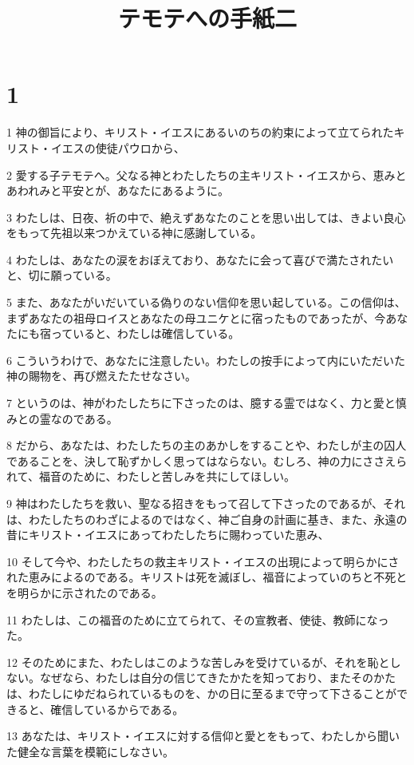 

\title{テモテへの手紙二}


\chapter{1}

\par 1 神の御旨により、キリスト・イエスにあるいのちの約束によって立てられたキリスト・イエスの使徒パウロから、
\par 2 愛する子テモテへ。父なる神とわたしたちの主キリスト・イエスから、恵みとあわれみと平安とが、あなたにあるように。
\par 3 わたしは、日夜、祈の中で、絶えずあなたのことを思い出しては、きよい良心をもって先祖以来つかえている神に感謝している。
\par 4 わたしは、あなたの涙をおぼえており、あなたに会って喜びで満たされたいと、切に願っている。
\par 5 また、あなたがいだいている偽りのない信仰を思い起している。この信仰は、まずあなたの祖母ロイスとあなたの母ユニケとに宿ったものであったが、今あなたにも宿っていると、わたしは確信している。
\par 6 こういうわけで、あなたに注意したい。わたしの按手によって内にいただいた神の賜物を、再び燃えたたせなさい。
\par 7 というのは、神がわたしたちに下さったのは、臆する霊ではなく、力と愛と慎みとの霊なのである。
\par 8 だから、あなたは、わたしたちの主のあかしをすることや、わたしが主の囚人であることを、決して恥ずかしく思ってはならない。むしろ、神の力にささえられて、福音のために、わたしと苦しみを共にしてほしい。
\par 9 神はわたしたちを救い、聖なる招きをもって召して下さったのであるが、それは、わたしたちのわざによるのではなく、神ご自身の計画に基き、また、永遠の昔にキリスト・イエスにあってわたしたちに賜わっていた恵み、
\par 10 そして今や、わたしたちの救主キリスト・イエスの出現によって明らかにされた恵みによるのである。キリストは死を滅ぼし、福音によっていのちと不死とを明らかに示されたのである。
\par 11 わたしは、この福音のために立てられて、その宣教者、使徒、教師になった。
\par 12 そのためにまた、わたしはこのような苦しみを受けているが、それを恥としない。なぜなら、わたしは自分の信じてきたかたを知っており、またそのかたは、わたしにゆだねられているものを、かの日に至るまで守って下さることができると、確信しているからである。
\par 13 あなたは、キリスト・イエスに対する信仰と愛とをもって、わたしから聞いた健全な言葉を模範にしなさい。
